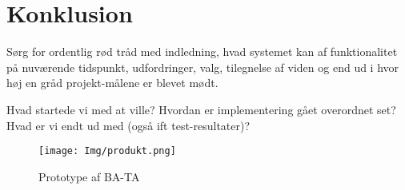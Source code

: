 \graphicspath{{Chapters/Konklusion/}}


\section{Konklusion}



Sørg for ordentlig rød tråd med indledning, hvad systemet kan af funktionalitet på nuværende tidspunkt, udfordringer, valg, tilegnelse af viden og end ud i hvor høj en gråd projekt-målene er blevet mødt.

Hvad startede vi med at ville?
Hvordan er implementering gået overordnet set?
Hvad er vi endt ud med (også ift test-resultater)?

\begin{figure}[H]
	\centering
	\texttt{[image: Img/produkt.png]}
	\caption{Prototype af BA-TA}
	\label{fig:prototypeBATA}
\end{figure}